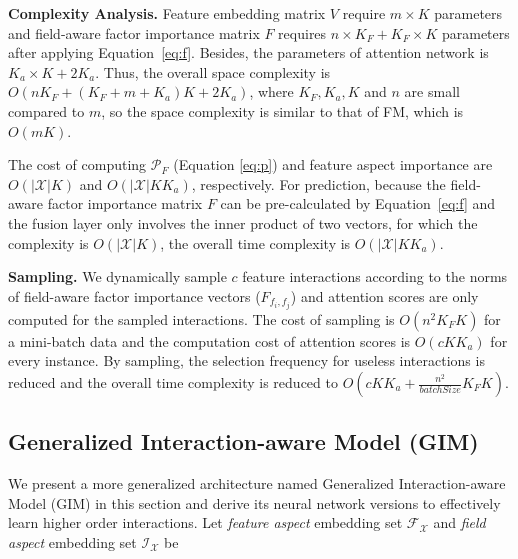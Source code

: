 \documentclass[letterpaper]{article} \usepackage{aaai19}  \usepackage{times}  \usepackage{helvet}  \usepackage{courier}  \usepackage{url}  \usepackage{graphicx}  \frenchspacing  \setlength{\pdfpagewidth}{8.5in}  \setlength{\pdfpageheight}{11in}  \usepackage{mathtools}
\begin{document}
\textbf{Complexity Analysis.} Feature embedding matrix $V$ require $m \times K$ parameters and field-aware factor importance matrix $F$ requires $n \times K_F + K_F \times K$ parameters after applying Equation~\ref{eq:f}. Besides, the parameters of attention network is $K_a \times K + 2K_a$. Thus, the overall space complexity is $O(n K_F+(K_F+m+K_a) K + 2K_a)$, where $K_F,K_a,K$ and $n$ are small compared to $m$, so the space complexity is similar to that of FM, which is $O(m K)$.

The cost of computing $\mathcal{P}_F$ (Equation \ref{eq:p}) and feature aspect importance are $O(|\mathcal{X}| K)$ and $O(|\mathcal{X}| K K_a)$, respectively. For prediction, because the field-aware factor importance matrix $F$ can be pre-calculated by Equation~\ref{eq:f} and the fusion layer only involves the inner product of two vectors, for which the complexity is $O(|\mathcal{X}| K)$, the overall time complexity is $O(|\mathcal{X}| K K_a)$. 

\textbf{Sampling.} We dynamically sample $c$ feature interactions according to the norms of field-aware factor importance vectors ($F_{f_i,f_j}$) and attention scores are only computed for the sampled interactions. The cost of sampling is $O(n^2 K_F K)$ for a mini-batch data and the computation cost of attention scores is $O(c K K_a)$ for every instance. By sampling, the selection frequency for useless interactions is reduced and the overall time complexity is reduced to $O(c K K_a + \frac{n^2}{batchSize} K_FK)$. 


\subsection{Generalized Interaction-aware Model (GIM)}
We present a more generalized architecture named Generalized Interaction-aware Model (GIM) in this section and derive its neural network versions to effectively learn higher order interactions. Let \emph{feature aspect} embedding set $\mathcal{F_X}$  and \emph{field aspect} embedding set $\mathcal{I_X}$ be
\end{document}
